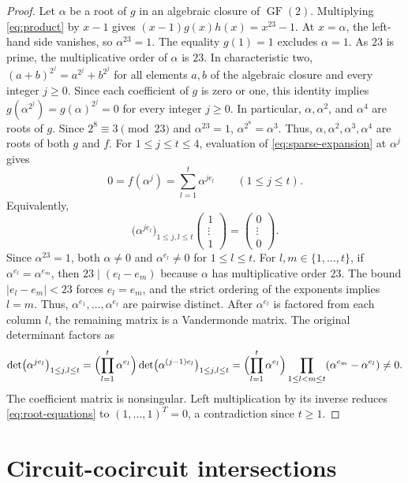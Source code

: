 \documentclass[11pt]{article}
\numberwithin{equation}{section}
\DeclareMathOperator{\GF}{GF}
\begin{document}
\begin{proof}
Let $\alpha$ be a root of $g$ in an algebraic closure of $\GF(2)$.
Multiplying \eqref{eq:product} by $x-1$ gives $(x-1)g(x)h(x)=x^{23}-1$.
At $x=\alpha$, the left-hand side vanishes, so $\alpha^{23}=1$.
The equality $g(1)=1$ excludes $\alpha=1$. As $23$ is prime,
the multiplicative order of $\alpha$ is $23$.
In characteristic two, $(a+b)^{2^j}=a^{2^j}+b^{2^j}$ for all elements
$a,b$ of the algebraic closure and every integer $j\geq0$.
Since each coefficient of $g$ is zero or one, this identity implies
$g(\alpha^{2^j})=g(\alpha)^{2^j}=0$ for every integer $j\geq0$.
In particular, $\alpha,\alpha^2$, and $\alpha^4$ are roots of $g$.
Since $2^8\equiv3\pmod{23}$ and $\alpha^{23}=1$,
$\alpha^{2^8}=\alpha^3$.
Thus, $\alpha,\alpha^2,\alpha^3,\alpha^4$ are roots of both $g$ and $f$.
For $1\leq j\leq t\leq4$, evaluation of \eqref{eq:sparse-expansion}
at $\alpha^j$ gives
\[
 0=f(\alpha^j)=\sum_{l=1}^{t}\alpha^{je_l}
 \qquad (1\leq j\leq t).
\]
Equivalently,
\begin{equation}\label{eq:root-equations}
 \bigl(\alpha^{je_l}\bigr)_{1\leq j,l\leq t}
 \begin{pmatrix}1\\\vdots\\1\end{pmatrix}
 =\begin{pmatrix}0\\\vdots\\0\end{pmatrix}.
\end{equation}
Since $\alpha^{23}=1$, both $\alpha\ne0$ and
$\alpha^{e_l}\ne0$ for $1\leq l\leq t$.
For $l,m\in\{1,\ldots,t\}$, if $\alpha^{e_l}=\alpha^{e_m}$, then
$23\mid(e_l-e_m)$ because $\alpha$ has multiplicative order $23$.
The bound $|e_l-e_m|<23$ forces $e_l=e_m$, and the strict ordering of
the exponents implies $l=m$. Thus, $\alpha^{e_1},\ldots,\alpha^{e_t}$
are pairwise distinct.
After $\alpha^{e_l}$ is factored from each column $l$, the remaining
matrix is a Vandermonde matrix. The original determinant factors as
\[
 \det\bigl(\alpha^{je_l}\bigr)_{1\leq j,l\leq t}=\Bigl(\prod_{l=1}^{t}\alpha^{e_l}\Bigr)\det\bigl(\alpha^{(j-1)e_l}\bigr)_{1\leq j,l\leq t}=\Bigl(\prod_{l=1}^{t}\alpha^{e_l}\Bigr)
   \prod_{1\leq l<m\leq t}(\alpha^{e_m}-\alpha^{e_l})\ne0.
\]
The coefficient matrix is nonsingular. Left multiplication by its inverse
reduces \eqref{eq:root-equations} to $(1,\ldots,1)^T=0$,
a contradiction since $t\geq1$.
\end{proof}

\section{Circuit-cocircuit intersections}
\end{document}
